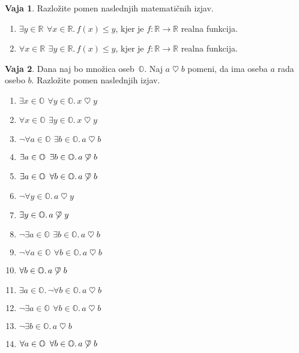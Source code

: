 \documentclass{article}
\theoremstyle{definition}
\newtheorem{vaja}{Vaja}
\begin{document}
\begin{vaja}
Razložite pomen naslednjih matematičnih izjav.
\begin{enumerate}
 \item $\exists y \in \mathbb{R}\,\ \forall x \in \mathbb{R}. \,  f(x) \leq y$, kjer je $f \colon \mathbb{R} \to \mathbb{R}$ realna funkcija.
 \item $\forall x \in \mathbb{R}\,\ \exists y \in \mathbb{R}. \,  f(x) \leq y$, kjer je $f \colon \mathbb{R} \to \mathbb{R}$ realna funkcija.
 \end{enumerate}
\end{vaja}

\newcommand{\rad}{\mathrel{\heartsuit}}
\begin{vaja}
Dana naj bo množica oseb~$\mathbb{O}$. Naj $a \rad b$ pomeni, da ima oseba $a$ rada osebo $b$.
Razložite pomen naslednjih izjav.
\begin{enumerate}
\item $\exists x \in \mathbb{O}\,\ \forall y \in \mathbb{O}. \, x \rad y$
\item $\forall x \in \mathbb{O}\,\ \exists y \in \mathbb{O}. \, x \rad y$
\item $\lnot \forall a \in \mathbb{O}\,\ \exists b \in \mathbb{O}.  \, a \rad b$
\item $\exists a \in \mathbb{O}\,\ \exists b \in \mathbb{O}. \, a \not\rad b$
\item $\exists a \in \mathbb{O}\,\ \forall b \in \mathbb{O}. \, a \not\rad b$
\item $\lnot \forall y \in \mathbb{O}. \, a \rad y$
\item $\exists y \in \mathbb{O}. \, a \not\rad y$
\item $\lnot \exists a \in \mathbb{O}\,\ \exists b \in \mathbb{O}. \, a \rad b$
\item $\lnot \forall a \in \mathbb{O}\,\ \forall b \in \mathbb{O}. \, a \rad b$
\item $\forall b \in \mathbb{O}. \, a \not\rad b$
\item $\exists a \in \mathbb{O}. \, \lnot \forall b \in \mathbb{O}. \,  a \rad b$
\item $\lnot \exists a \in \mathbb{O}\,\ \forall b \in \mathbb{O}. \, a \rad b$
\item $\lnot \exists b \in \mathbb{O}. \, a \rad b$
\item $\forall a \in \mathbb{O}\,\ \forall b \in \mathbb{O}. \,  a \not\rad b$
\end{enumerate}
\end{vaja}
\end{document}
